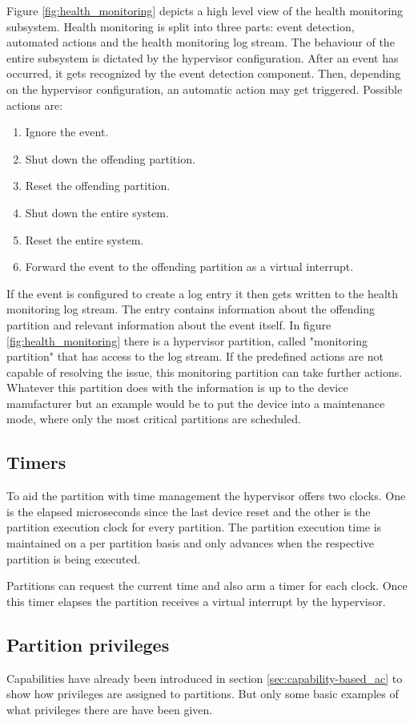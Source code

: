 Figure \ref{fig:health_monitoring} depicts a high level view of the health monitoring subsystem. Health monitoring is split into three parts: event detection, automated actions and the health monitoring log stream. The behaviour of the entire subsystem is dictated by the hypervisor configuration.
After an event has occurred, it gets recognized by the event detection component. Then, depending on the hypervisor configuration, an automatic action may get triggered. Possible actions are:
\begin{enumerate}
    \item Ignore the event.
    \item Shut down the offending partition.
    \item Reset the offending partition.
    \item Shut down the entire system.
    \item Reset the entire system.
    \item Forward the event to the offending partition as a virtual interrupt.
\end{enumerate}

If the event is configured to create a log entry it then gets written to the health monitoring log stream. The entry contains information about the offending partition and relevant information about the event itself. In figure \ref{fig:health_monitoring} there is a hypervisor partition, called "monitoring partition" that has access to the log stream. If the predefined actions are not capable of resolving the issue, this monitoring partition can take further actions. Whatever this partition does with the information is up to the device manufacturer but an example would be to put the device into a maintenance mode, where only the most critical partitions are scheduled. 

\subsection{Timers}
To aid the partition with time management the hypervisor offers two clocks. One is the elapsed microseconds since the last device reset and the other is the partition execution clock for every partition. The partition execution time is maintained on a per partition basis and only advances when the respective partition is being executed.

Partitions can request the current time and also arm a timer for each clock. Once this timer elapses the partition receives a virtual interrupt by the hypervisor. 
\subsection{Partition privileges}
Capabilities have already been introduced in section \ref{sec:capability-based_ac} to show how privileges are assigned to partitions. But only some basic examples of what privileges there are have been given. 


